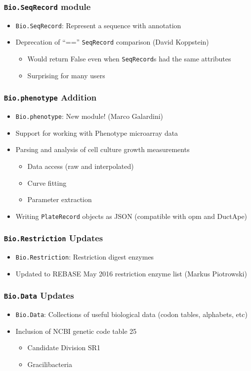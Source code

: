 \documentclass[trans]{beamer}
\begin{document}
\frame
{
  \frametitle{\texttt{Bio.SeqRecord} module}
  
  \begin{itemize}
  \item \texttt{Bio.SeqRecord}: Represent a sequence with annotation
  \item Deprecation of ``=='' \texttt{SeqRecord} comparison (David Koppstein)
  \begin{itemize}
  \item Would return False even when \texttt{SeqRecord}s had the same attributes
  \item Surprising for many users
  \end{itemize}
  \end{itemize}
}

\frame
{
  \frametitle{\texttt{Bio.phenotype} Addition}
  
  \begin{itemize}
  \item \texttt{Bio.phenotype}: New module! (Marco Galardini)
  \item Support for working with Phenotype microarray data
  \item Parsing and analysis of cell culture growth measurements
  \begin{itemize}
  \item Data access (raw and interpolated)
  \item Curve fitting
  \item Parameter extraction
  \end{itemize}
  \item Writing \texttt{PlateRecord} objects as JSON (compatible with opm and DuctApe)
  \end{itemize}
}

\frame
{
  \frametitle{\texttt{Bio.Restriction} Updates}
  
  \begin{itemize}
  \item \texttt{Bio.Restriction}: Restriction digest enzymes
  \item Updated to REBASE May 2016 restriction enzyme list (Markus Piotrowski)
  \end{itemize}
}

\frame
{
  \frametitle{\texttt{Bio.Data} Updates}
  
  \begin{itemize}
  \item \texttt{Bio.Data}: Collections of useful biological data (codon tables, alphabets, etc)
  \item Inclusion of NCBI genetic code table 25
  \begin{itemize}
  \item Candidate Division SR1
  \item Gracilibacteria
  \end{itemize}
  \end{itemize}
}
\end{document}
